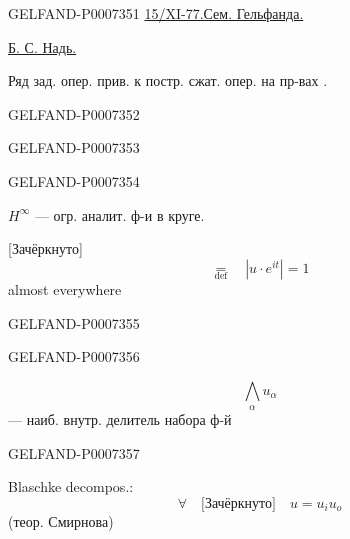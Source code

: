 \begin{GelfandAdjacentEvidence}{GELFAND-P000735}{1}
\noindent\underline{15/XI-77.}\hspace{2em}\underline{Сем. Гельфанда.}

\underline{Б. С. Надь.}

Ряд зад. опер. прив. к постр. сжат. опер. на пр-вах .
\end{GelfandAdjacentEvidence}
\begin{GelfandAdjacentEvidence}{GELFAND-P000735}{2}

\end{GelfandAdjacentEvidence}
\begin{GelfandAdjacentEvidence}{GELFAND-P000735}{3}

\end{GelfandAdjacentEvidence}
\begin{GelfandAdjacentEvidence}{GELFAND-P000735}{4}


\(H^\infty\) --- огр. аналит. ф-и в круге.

[Зачёркнуто] 
\[
\underset{\mathrm{def}}{=}\quad |u\cdot e^{it}|=1
\]
\hspace*{2em} almost everywhere
\end{GelfandAdjacentEvidence}
\begin{GelfandAdjacentEvidence}{GELFAND-P000735}{5}

\end{GelfandAdjacentEvidence}
\begin{GelfandAdjacentEvidence}{GELFAND-P000735}{6}


\[
\bigwedge_\alpha u_\alpha
\]
--- наиб. внутр. делитель набора ф-й

\end{GelfandAdjacentEvidence}
\begin{GelfandAdjacentEvidence}{GELFAND-P000735}{7}

Blaschke decompos.:
\[
\forall\quad\text{[Зачёркнуто]}\quad u=u_i u_o
\]
\hspace*{2em} (теор. Смирнова)
\end{GelfandAdjacentEvidence}
